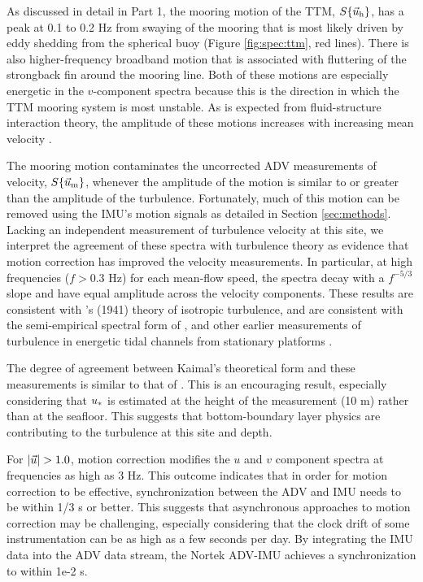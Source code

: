As discussed in detail in Part 1, the mooring motion of the TTM, $S\{\vec{u}_\mathrm{h}\}$, has a peak at 0.1 to 0.2 Hz from swaying of the mooring that is most likely driven by eddy shedding from the spherical buoy (Figure \ref{fig:spec:ttm}, red lines). There is also higher-frequency broadband motion that is associated with fluttering of the strongback fin around the mooring line. Both of these motions are especially energetic in the $v$-component spectra because this is the direction in which the TTM mooring system is most unstable. As is expected from fluid-structure interaction theory, the amplitude of these motions increases with increasing mean velocity \cite[]{Morison++1950}.

The mooring motion contaminates the uncorrected ADV measurements of velocity, $S\{\vec{u}_\mathrm{m}\}$, whenever the amplitude of the motion is similar to or greater than the amplitude of the turbulence. Fortunately, much of this motion can be removed using the IMU's motion signals as detailed in Section \ref{sec:methods}. Lacking an independent measurement of turbulence velocity at this site, we interpret the agreement of these spectra with turbulence theory as evidence that motion correction has improved the velocity measurements. In particular, at high frequencies ($f>0.3$ Hz) for each mean-flow speed, the spectra decay with a $f^{-5/3}$ slope and have equal amplitude across the velocity components. These results are consistent with \citeauthor{Kolmogorov1941c}'s (1941) theory of isotropic turbulence, and are consistent with the semi-empirical spectral form of \cite{Kaimal++1972}, and other earlier measurements of turbulence in energetic tidal channels from stationary platforms \cite[]{Walter++2011, Thomson++2012, McMillan++2016}.

The degree of agreement between Kaimal's theoretical form and these measurements is similar to that of \cite{Walter++2011}. This is an encouraging result, especially considering that $u_*$ is estimated at the height of the measurement (10 m) rather than at the seafloor. This suggests that bottom-boundary layer physics are contributing to the turbulence at this site and depth.

For $|\ue|>1.0$, motion correction modifies the $u$ and $v$ component spectra at frequencies as high as 3 Hz. This outcome indicates that in order for motion correction to be effective, synchronization between the ADV and IMU needs to be within 1/3 s or better. This suggests that asynchronous approaches to motion correction may be challenging, especially considering that the clock drift of some instrumentation can be as high as a few seconds per day. By integrating the IMU data into the ADV data stream, the Nortek ADV-IMU achieves a synchronization to within 1e-2 s. 

